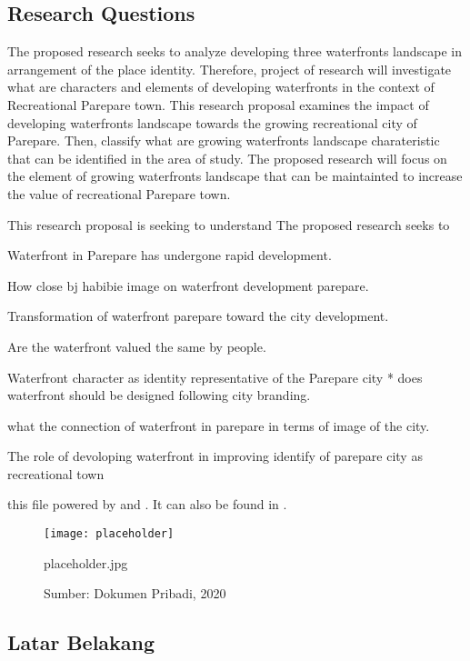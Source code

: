 \documentclass[11pt]{simart} %
\begin{document}
\subsection{Research Questions}

The proposed research seeks to analyze developing three waterfronts landscape in arrangement of the place identity. Therefore, project of research will investigate what are characters and elements of developing waterfronts in the context of Recreational Parepare town.
This research proposal examines the impact of developing waterfronts landscape towards the growing recreational city of Parepare. Then, classify what are growing waterfronts landscape charateristic that can be identified in the area of study.
The proposed research will focus on the element of growing waterfronts landscape that can be maintainted to increase the value of recreational Parepare town.

This research proposal is seeking to understand
The proposed research seeks to


Waterfront in Parepare has undergone rapid development.

How close bj habibie image on waterfront development parepare.

Transformation of waterfront parepare toward the city development.

Are the waterfront valued the same by people.

Waterfront character as identity representative of the Parepare city
* does waterfront should be designed following city branding.

what the connection of waterfront in parepare in terms of image of the city.

The role of devoloping waterfront in improving identify of parepare city as recreational town



this file powered by \citep{einstein} and \citep{latexcompanion}. It can also be found in \cite{knuthwebsite}.

\begin{figure}[htpb]
	\centering
	\texttt{[image: placeholder]}
	\caption{placeholder.jpg}
	\caption*{Sumber: Dokumen Pribadi, 2020}
	\label{fig:placeholder-jpg}
\end{figure}
\lipsum[1-3]

\subsection{Latar Belakang}
\end{document}
